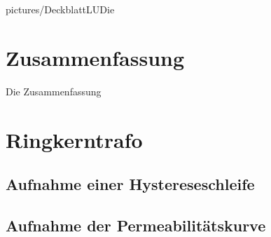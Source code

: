 \documentclass[a4paper,twoside,12pt,DIV=13,BCOR=5mm,numbers=noenddot,cleardoublepage=empty]{scrbook}
\begin{document}
\newcommand\todo[1]{\textcolor{red}{#1}}
\renewcommand{\baselinestretch}{1.25}
\newcommand{\StudentA}{Marton Harsch}
\newcommand{\MatrNrA}{12123680}
\newcommand{\StudentB}{Michael Malburg}
\newcommand{\MatrNrB}{61806515}
\newcommand{\StudentC}{Jonathan Gamperl}
\newcommand{\MatrNrC}{12302766}

\newcommand{\LUDatum}{22.4.2024}
\newcommand{\LUGruppe}{}
\newcommand{\LUBetreuer}{}

\large

{pictures/DeckblattLUDie}     %



\cleardoublepage
\setcounter{tocdepth}{3}

\setcounter{page}{0}
\renewcommand{\thepage}{\roman{page}}
\tableofcontents \cleardoublepage

\setcounter{page}{1}
\renewcommand{\thepage}{\arabic{page}}
\setcounter{chapter}{0}



\newpage
\chapter{Zusammenfassung}
Die Zusammenfassung
\newpage
\chapter{Ringkerntrafo}
\section{Aufnahme einer Hystereseschleife}

\section{Aufnahme der Permeabilit\"atskurve}
\end{document}
